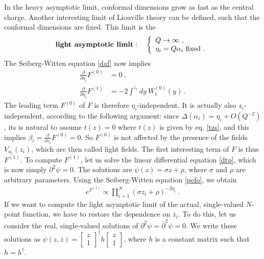\documentclass[12pt,a4paper,notitlepage]{report}
\numberwithin{equation}{section}
\theoremstyle{break}
\begin{document}
In the heavy asymptotic limit, conformal dimensions grow as fast as the central charge.
Another interesting limit of Liouville theory can be defined, such that the conformal dimensions are fixed.
This limit is the
\begin{align}
 \textbf{\boldmath light\ asymptotic\ limit}\index{light\ asymptotic\ limit}: \quad \left\{\begin{array}{l}  Q \rightarrow \infty \ ,\\ \eta_i=Q\alpha_i\ \text{fixed}\ .\end{array}\right.  
\end{align}
 The Seiberg-Witten equation \eqref{daf} now implies 
\begin{align}
 {\frac{\partial}{\partial \eta_i}} F^{(0)} & = 0 \ ,
\\ 
{\frac{\partial}{\partial \eta_i}} F^{(1)} & = -2\int^{z_i} dy\  W_1^{(0)}(y) \ .
\label{pefo}
\end{align}
The leading term $F^{(0)}$ of $F$ is therefore $\eta_i$-independent.
It is actually also $z_i$-independent, according to the following argument: since $\Delta(\alpha_i)=\eta_i + O(Q^{-2})$, its is natural to assume $t(z)=0$ where $t(z)$ is given by eq. \eqref{tzs}, and this implies $\beta_i={\frac{\partial}{\partial z_i}} F^{(0)}=0$.
So $F^{(0)}$ is not affected by the presence of the fields $V_{\alpha_i}(z_i)$, which are then called light fields.
The first interesting term of $F$ is thus $F^{(1)}$.
To compute $F^{(1)}$, let us solve the linear differential equation \eqref{dtp}, which is now simply $\partial^2 \psi=0$.
The solutions are $\psi(z) = \sigma z + \rho$, where $\sigma$ and $\rho$ are arbitrary parameters.
Using the Seiberg-Witten equation \eqref{pefo}, we obtain
\begin{align}
 e^{F^{(1)}} \propto \prod_{i=1}^N (\sigma z_i + \rho)^{-2\eta_i} \ .
\end{align}
If we want to compute the light asymptotic limit of the actual, single-valued $N$-point function, we have to restore the dependence on $\bar{z}_i$.
To do this, let us consider the real, single-valued solutions of $\partial^2 \psi = \bar{\partial}^2\psi=0$.
We write these solutions as $\psi(z,\bar{z}) = \left[\begin{smallmatrix} z \\ 1 \end{smallmatrix}\right]^\dagger h \left[\begin{smallmatrix} z \\ 1 \end{smallmatrix}\right]$, where $h$ is a constant matrix such that $h=h^\dagger$.
\end{document}
